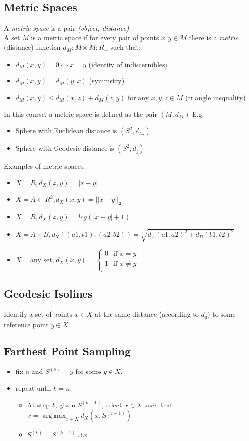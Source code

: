 \documentclass[11pt]{article}
\DeclareMathOperator*{\argmax}{arg\,max}
\begin{document}
\subsection{Metric Spaces}
A \textit{metric space} is a pair \textit{(object, distance)}.\\
A set $M$ is a metric space if for every pair of points $x,y \in M$ there is a \textit{metric} (distance) function $d_M: M \times M: R_+$ such that:
\begin{itemize}
	\item $d_M(x,y)=0 \Leftrightarrow x=y$ (identity of indiscernibles)
	\item $d_M(x,y)=d_M(y,x)$ (symmetry)
	\item $d_M(x,y) \leq d_M(x,z) + d_M(z,y)$ for any $x,y,z \in M$ (triangle inequality)
\end{itemize}
In this course, a metric space is defined as the pair $(M,d_M)$
E.g:
\begin{itemize}
	\item Sphere with Euclidean distance is $(S^2, d_{L_2})$
	\item Sphere with Geodesic distance is $(S^2, d_g)$
\end{itemize}
Examples of metric spaces:
\begin{itemize}
	\item $X=R, d_X(x,y) = |x-y|$
	\item $X=A \subset R^k, d_X(x,y) = ||x-y||_2$
	\item $X=R, d_X(x,y) = log(|x-y|+1)$
	\item $X = A \times B, d_X((a1,b1),(a2,b2)) = \sqrt{d_A(a1,a2)^2 + d_B(b1,b2)^2}$
	\item $X=$any set, $d_X(x,y) = \begin{cases}
		0 & \mbox{if } x=y\\
		1 & \mbox{if } x \neq y\\
	\end{cases}$
\end{itemize}

\subsection{Geodesic Isolines}
Identify a set of points $x \in X$ at the same distance (according to $d_g$) to some reference point $y \in X$.


\subsection{Farthest Point Sampling}
\begin{itemize}
	\item fix $n$ and $S^{(0)} = y$ for some $y \in X$.
	\item repeat until $k = n$:
	\begin{itemize}
		\item At step $k$, given $S^{(k-1)}$, select $x \in X$ such that\\
			$x = \argmax_{x \in X} d_X(x,S^{(k-1)})$
		\item $S^(k) = S^{(k-1)} \cup x	$
	\end{itemize}
\end{itemize}
\end{document}
